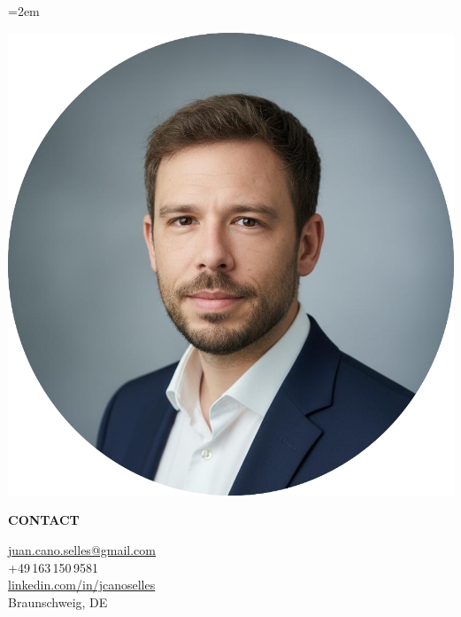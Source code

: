 \documentclass[12pt,a4paper]{article} %
\newcommand{\headleft}[1]{%
  \vspace*{2ex}\textsc{\textbf{\color{softwhite}#1}}\par%
  \vspace*{-1.2ex}{\color{softwhite}\hrulefill}\par\vspace*{0.8ex}
}
\newlength{\SideBarW}
\begin{document}
\pagestyle{empty}
\sloppy
\emergencystretch=2em
\setlength{\parindent}{0pt}
\setlength{\parskip}{0pt}

\vspace*{-10mm}
\noindent\begin{minipage}[t]{\textwidth}

\colorbox{cvblue!90}{%
  \parbox[t][\textheight][t]{\SideBarW}{%
    \hspace*{4mm}%
    \begin{minipage}[t]{\dimexpr\linewidth-8mm\relax}
      \color{softwhite}
      \vspace*{6mm}
      \begin{center}
        \includegraphics[width=0.85\linewidth]{Resume_Juan_Cano.png}
      \end{center}

      \headleft{CONTACT}
      \small
      \href{mailto:juan.cano.selles@gmail.com}{juan.cano.selles@gmail.com} \\[0.6ex]
      +49\,163\,150\,9581 \\[0.6ex]
      \href{https://www.linkedin.com/in/jcanoselles}{linkedin.com/in/jcanoselles} \\[0.6ex]
      Braunschweig, DE
      \normalsize

      \vspace*{3mm}


\end{minipage}}}
\end{minipage}
\end{document}
